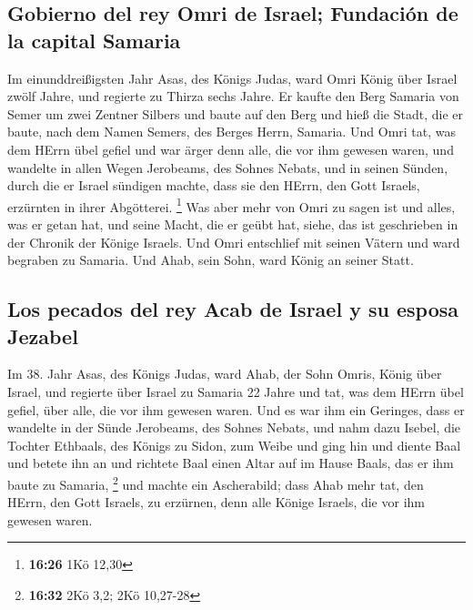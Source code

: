 \hypertarget{gobierno-del-rey-omri-de-israel-fundaciuxf3n-de-la-capital-samaria}{%
\subsection{Gobierno del rey Omri de Israel; Fundación de la capital
Samaria}\label{gobierno-del-rey-omri-de-israel-fundaciuxf3n-de-la-capital-samaria}}

 Im einunddreißigsten Jahr Asas, des Königs Judas, ward
Omri König über Israel zwölf Jahre, und regierte zu Thirza sechs Jahre.
 Er kaufte den Berg Samaria von Semer um zwei Zentner
Silbers und baute auf den Berg und hieß die Stadt, die er baute, nach
dem Namen Semers, des Berges Herrn, Samaria.  Und Omri
tat, was dem HErrn übel gefiel und war ärger denn alle, die vor ihm
gewesen waren,  und wandelte in allen Wegen Jerobeams,
des Sohnes Nebats, und in seinen Sünden, durch die er Israel sündigen
machte, dass sie den HErrn, den Gott Israels, erzürnten in ihrer
Abgötterei. \footnote{\textbf{16:26} 1Kö 12,30}  Was aber
mehr von Omri zu sagen ist und alles, was er getan hat, und seine Macht,
die er geübt hat, siehe, das ist geschrieben in der Chronik der Könige
Israels.  Und Omri entschlief mit seinen Vätern und ward
begraben zu Samaria. Und Ahab, sein Sohn, ward König an seiner Statt.

\hypertarget{los-pecados-del-rey-acab-de-israel-y-su-esposa-jezabel}{%
\subsection{Los pecados del rey Acab de Israel y su esposa
Jezabel}\label{los-pecados-del-rey-acab-de-israel-y-su-esposa-jezabel}}

 Im 38. Jahr Asas, des Königs Judas, ward Ahab, der Sohn
Omris, König über Israel, und regierte über Israel zu Samaria 22 Jahre
 und tat, was dem HErrn übel gefiel, über alle, die vor
ihm gewesen waren.  Und es war ihm ein Geringes, dass er
wandelte in der Sünde Jerobeams, des Sohnes Nebats, und nahm dazu
Isebel, die Tochter Ethbaals, des Königs zu Sidon, zum Weibe und ging
hin und diente Baal und betete ihn an  und richtete Baal
einen Altar auf im Hause Baals, das er ihm baute zu Samaria, \footnote{\textbf{16:32}
  2Kö 3,2; 2Kö 10,27-28}  und machte ein Ascherabild;
dass Ahab mehr tat, den HErrn, den Gott Israels, zu erzürnen, denn alle
Könige Israels, die vor ihm gewesen waren.

